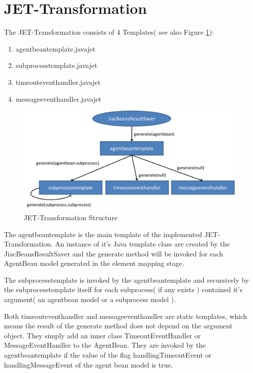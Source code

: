 \section{JET-Transformation}
The JET-Transformation consists of 4 Templates( see also Figure \ref{fig:transformation_structure}): 
\begin{enumerate}
	\item agentbeantemplate.javajet
	\item subprocesstemplate.javajet
	\item timeouteventhandler.javajet
	\item messageeventhandler.javajet
\end{enumerate}

\begin{figure}[h]
	\centering\includegraphics[width=1.0\textwidth]{images/templates_structure.png}
	\caption{JET-Transformation Structure}
	\label{fig:transformation_structure}
\end{figure}

The agentbeantemplate is the main template of the implemented JET-Transformation. An instance of it's Java template class are created by the JiacBeansResultSaver and the generate method will be invoked for each AgentBean model generated in the element mapping stage. 

The subprocesstemplate is invoked by the agentbeantemplate and recursively by the subprocesstemplate itself for each subprocess( if any exists ) contained it's argument( an agentbean model or a subprocess model ). 

Both timeouteventhandler and messageeventhandler are static templates, which means the result of the generate method does not depend on the argument object. They simply add an inner class TimeoutEventHandler or MessageEventHandler to the AgentBean. They are invoked by the agentbeantemplate if the value of the flag handlingTimeoutEvent or handlingMessageEvent of the agent bean model is true.


